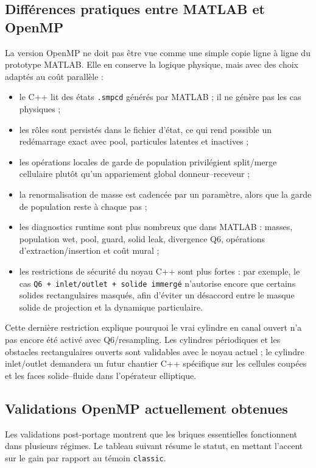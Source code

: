 \documentclass[11pt,a4paper]{article}
\begin{document}
\subsection{Différences pratiques entre MATLAB et OpenMP}

La version OpenMP ne doit pas être vue comme une simple copie ligne à ligne du prototype MATLAB. Elle en conserve la logique physique, mais avec des choix adaptés au coût parallèle :
\begin{itemize}
  \item le C++ lit des états \texttt{.smpcd} générés par MATLAB ; il ne génère pas les cas physiques ;
  \item les rôles sont persistés dans le fichier d'état, ce qui rend possible un redémarrage exact avec pool, particules latentes et inactives ;
  \item les opérations locales de garde de population privilégient split/merge cellulaire plutôt qu'un appariement global donneur--receveur ;
  \item la renormalisation de masse est cadencée par un paramètre, alors que la garde de population reste à chaque pas ;
  \item les diagnostics runtime sont plus nombreux que dans MATLAB : masses, population wet, pool, guard, solid leak, divergence Q6, opérations d'extraction/insertion et coût mural ;
  \item les restrictions de sécurité du noyau C++ sont plus fortes : par exemple, le cas \texttt{Q6 + inlet/outlet + solide immergé} n'autorise encore que certains solides rectangulaires masqués, afin d'éviter un désaccord entre le masque solide de projection et la dynamique particulaire.
\end{itemize}

Cette dernière restriction explique pourquoi le vrai cylindre en canal ouvert n'a pas encore été activé avec Q6/resampling. Les cylindres périodiques et les obstacles rectangulaires ouverts sont validables avec le noyau actuel ; le cylindre inlet/outlet demandera un futur chantier C++ spécifique sur les cellules coupées et les faces solide--fluide dans l'opérateur elliptique.

\subsection{Validations OpenMP actuellement obtenues}

Les validations post-portage montrent que les briques essentielles fonctionnent dans plusieurs régimes. Le tableau suivant résume le statut, en mettant l'accent sur le gain par rapport au témoin \texttt{classic}.
\end{document}
